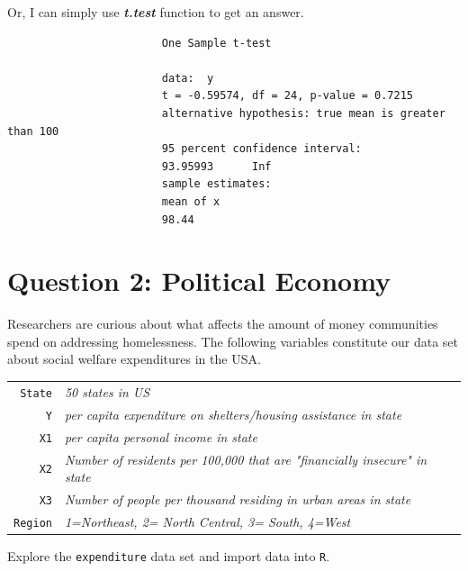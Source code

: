 \documentclass[12pt,letterpaper]{article}
\begin{document}
\begin{enumerate}
					\noindent Or, I can simply use \textbf{\textit{t.test}} function to get an answer.
				
						
					\begin{verbatim}
						One Sample t-test
						
						data:  y
						t = -0.59574, df = 24, p-value = 0.7215
						alternative hypothesis: true mean is greater than 100
						95 percent confidence interval:
						93.95993      Inf
						sample estimates:
						mean of x 
						98.44 
					\end{verbatim}
					
				\end{enumerate}

\section*{Question 2: Political Economy}

	\noindent Researchers are curious about what affects the amount of money communities spend on addressing homelessness. The following variables constitute our data set about social welfare expenditures in the USA. \\
	\vspace{.5cm}
	
	
	\begin{tabular}{r|l}
		\texttt{State} &\emph{50 states in US} \\
		\texttt{Y} & \emph{per capita expenditure on shelters/housing assistance in state}\\
		\texttt{X1} &\emph{per capita personal income in state} \\
		\texttt{X2} &  \emph{Number of residents per 100,000 that are "financially insecure" in state}\\
		\texttt{X3} &  \emph{Number of people per thousand residing in urban areas in state} \\
		\texttt{Region} &  \emph{1=Northeast, 2= North Central, 3= South, 4=West} \\
	\end{tabular}
	
	\vspace{.5cm}
	\noindent Explore the \texttt{expenditure} data set and import data into \texttt{R}.
	\vspace{.5cm}
	  
							
\end{document}
